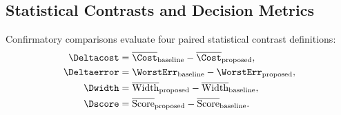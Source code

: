 
\subsection*{Statistical Contrasts and Decision Metrics}
Confirmatory comparisons evaluate four paired statistical contrast definitions:
\begin{align}
\Deltacost &= \overline{\Cost}_{\text{baseline}} - \overline{\Cost}_{\text{proposed}}, \\
\Deltaerror &= \WorstErr_{\text{baseline}} - \WorstErr_{\text{proposed}}, \\
\Dwidth &= \overline{\text{Width}}_{\text{proposed}} - \overline{\text{Width}}_{\text{baseline}}, \\
\Dscore &= \overline{\text{Score}}_{\text{proposed}} - \overline{\text{Score}}_{\text{baseline}}.
\end{align}

